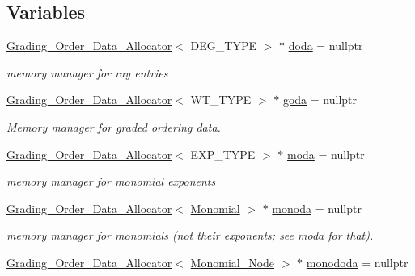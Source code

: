 \subsection*{Variables}
\begin{DoxyCompactItemize}
\item 
\hyperlink{group__memorygroup_class_grading___order___data___allocator}{Grading\+\_\+\+Order\+\_\+\+Data\+\_\+\+Allocator}$<$ D\+E\+G\+\_\+\+T\+Y\+PE $>$ $\ast$ \hyperlink{group__memorygroup_gab09a3dd19e9c8880eec08c13bcb42f36}{doda} = nullptr
\begin{DoxyCompactList}\small\item\em memory manager for ray entries \end{DoxyCompactList}\item 
\hyperlink{group__memorygroup_class_grading___order___data___allocator}{Grading\+\_\+\+Order\+\_\+\+Data\+\_\+\+Allocator}$<$ W\+T\+\_\+\+T\+Y\+PE $>$ $\ast$ \hyperlink{group__memorygroup_gadf1bccf09eada41d10a5d4ceda7ca479}{goda} = nullptr
\begin{DoxyCompactList}\small\item\em Memory manager for graded ordering data. \end{DoxyCompactList}\item 
\hyperlink{group__memorygroup_class_grading___order___data___allocator}{Grading\+\_\+\+Order\+\_\+\+Data\+\_\+\+Allocator}$<$ E\+X\+P\+\_\+\+T\+Y\+PE $>$ $\ast$ \hyperlink{group__memorygroup_gaf2c367d23e09c5dad7e0273995a3304c}{moda} = nullptr
\begin{DoxyCompactList}\small\item\em memory manager for monomial exponents \end{DoxyCompactList}\item 
\hyperlink{group__memorygroup_class_grading___order___data___allocator}{Grading\+\_\+\+Order\+\_\+\+Data\+\_\+\+Allocator}$<$ \hyperlink{group__polygroup_class_monomial}{Monomial} $>$ $\ast$ \hyperlink{group__memorygroup_ga76b5ae808895658b417e3f3a13c60e51}{monoda} = nullptr
\begin{DoxyCompactList}\small\item\em memory manager for monomials (not their exponents; see moda for that). \end{DoxyCompactList}\item 
\hyperlink{group__memorygroup_class_grading___order___data___allocator}{Grading\+\_\+\+Order\+\_\+\+Data\+\_\+\+Allocator}$<$ \hyperlink{group__polygroup_class_monomial___node}{Monomial\+\_\+\+Node} $>$ $\ast$ \hyperlink{group__memorygroup_ga2b5eeb775f6c601e624b487f3245983a}{monododa} = nullptr

\end{DoxyCompactItemize}
